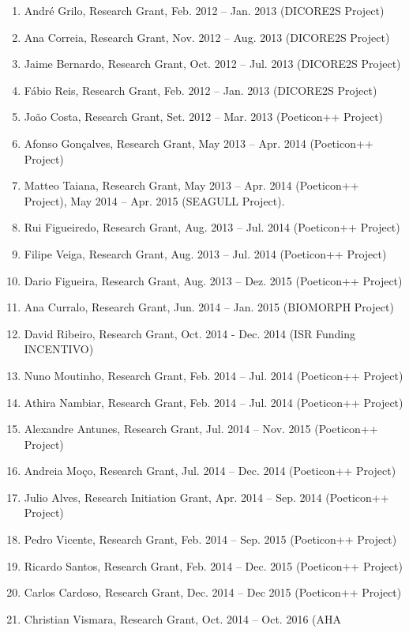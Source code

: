 \begin{enumerate}
\item
  André Grilo, Research Grant, Feb. 2012 -- Jan. 2013 (DICORE2S Project)
\item
  Ana Correia, Research Grant, Nov. 2012 -- Aug. 2013 (DICORE2S Project)
\item
  Jaime Bernardo, Research Grant, Oct. 2012 -- Jul. 2013 (DICORE2S
  Project)
\item
  Fábio Reis, Research Grant, Feb. 2012 -- Jan. 2013 (DICORE2S Project)
\item
  João Costa, Research Grant, Set. 2012 -- Mar. 2013 (Poeticon++
  Project)
\item
  Afonso Gonçalves, Research Grant, May 2013 -- Apr. 2014 (Poeticon++
  Project)
\item
  Matteo Taiana, Research Grant, May 2013 -- Apr. 2014 (Poeticon++
  Project), May 2014 -- Apr. 2015 (SEAGULL Project).
\item
  Rui Figueiredo, Research Grant, Aug. 2013 -- Jul. 2014 (Poeticon++
  Project)
\item
  Filipe Veiga, Research Grant, Aug. 2013 -- Jul. 2014 (Poeticon++
  Project)
\item
  Dario Figueira, Research Grant, Aug. 2013 -- Dez. 2015 (Poeticon++
  Project)
\item
  Ana Curralo, Research Grant, Jun. 2014 -- Jan. 2015 (BIOMORPH Project)
\item
  David Ribeiro, Research Grant, Oct. 2014 - Dec. 2014 (ISR Funding
  INCENTIVO)
\item
  Nuno Moutinho, Research Grant, Feb. 2014 -- Jul. 2014 (Poeticon++
  Project)
\item
  Athira Nambiar, Research Grant, Feb. 2014 -- Jul. 2014 (Poeticon++
  Project)
\item
  Alexandre Antunes, Research Grant, Jul. 2014 -- Nov. 2015 (Poeticon++
  Project)
\item
  Andreia Moço, Research Grant, Jul. 2014 -- Dec. 2014 (Poeticon++
  Project)
\item
  Julio Alves, Research Initiation Grant, Apr. 2014 -- Sep. 2014
  (Poeticon++ Project)
\item
  Pedro Vicente, Research Grant, Feb. 2014 -- Sep. 2015 (Poeticon++
  Project)
\item
  Ricardo Santos, Research Grant, Feb. 2014 -- Dec. 2015 (Poeticon++
  Project)
\item
  Carlos Cardoso, Research Grant, Dec. 2014 -- Dec 2015 (Poeticon++
  Project)
\item
  Christian Vismara, Research Grant, Oct. 2014 -- Oct. 2016 (AHA

\end{enumerate}
